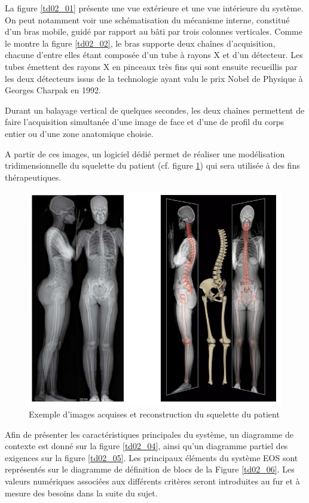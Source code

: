 La figure \ref{td02_01} présente une vue extérieure et une vue intérieure du système. On peut notamment voir une
schématisation du mécanisme interne, constitué d'un bras mobile, guidé par rapport au bâti par trois colonnes
verticales. Comme le montre la figure \ref{td02_02}, le bras supporte deux chaînes d'acquisition, chacune d'entre elles étant composée d'un tube à rayons X et d'un détecteur. Les tubes émettent des rayons X en pinceaux très fins qui sont ensuite recueillis par les deux détecteurs issus de la technologie ayant valu le prix Nobel de Physique à Georges Charpak en 1992.

Durant un balayage vertical de quelques secondes, les deux chaînes permettent de faire l'acquisition simultanée d'une image de face et d'une de profil du corps entier ou d'une zone anatomique choisie.

A partir de ces images, un logiciel dédié permet de réaliser une modélisation tridimensionnelle du squelette du patient (cf. figure \ref{td02_03}) qui sera utilisée à des fins thérapeutiques.

\begin{figure}[!h]
 \centering \includegraphics[width=0.8\linewidth]{img/td02_03}
 \caption{Exemple d'images acquises et reconstruction du squelette du patient}
 \label{td02_03}
\end{figure}

Afin de présenter les caractéristiques principales du système, un diagramme de contexte est donné sur la
figure \ref{td02_04}, ainsi qu'un diagramme partiel des exigences sur la figure \ref{td02_05}. Les principaux éléments du système EOS sont représentés sur le diagramme de définition de blocs de la Figure \ref{td02_06}. Les valeurs numériques associées aux différents critères seront introduites au fur et à mesure des besoins dans la suite du sujet.

